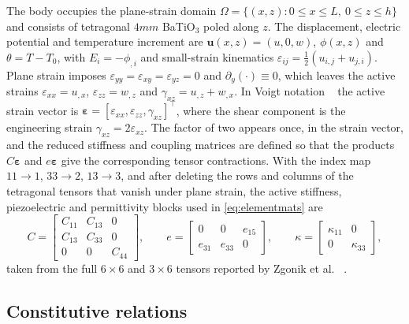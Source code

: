 \documentclass[a4paper,12pt]{elsarticle}
\begin{document}
The body occupies the plane-strain domain $\Omega=\{(x,z):0\le x\le L,\ 0\le z\le h\}$
and consists of tetragonal $4mm$ BaTiO$_3$ poled along $z$. The displacement, electric
potential and temperature increment are $\bm u(x,z)=(u,0,w)$, $\phi(x,z)$ and
$\theta=T-T_0$, with $E_i=-\phi_{,i}$ and small-strain kinematics
$\varepsilon_{ij}=\tfrac12(u_{i,j}+u_{j,i})$. Plane strain imposes
$\varepsilon_{yy}=\varepsilon_{xy}=\varepsilon_{yz}=0$ and $\partial_y(\cdot)\equiv0$,
which leaves the active strains $\varepsilon_{xx}=u_{,x}$, $\varepsilon_{zz}=w_{,z}$
and $\gamma_{xz}=u_{,z}+w_{,x}$. In Voigt notation ~\cite{Nye1985,IEEE176} the active
strain vector is $\bm\varepsilon=[\varepsilon_{xx},\varepsilon_{zz},\gamma_{xz}]^\top$,
where the shear component is the engineering strain $\gamma_{xz}=2\varepsilon_{xz}$.
The factor of two appears once, in the strain vector, and the reduced stiffness and
coupling matrices are defined so that the products $C\bm\varepsilon$ and
$e\bm\varepsilon$ give the corresponding tensor contractions. With the index map
$11\to1$, $33\to2$, $13\to3$, and after deleting the rows and columns of the tetragonal
tensors that vanish under plane strain, the active stiffness, piezoelectric and
permittivity blocks used in \eqref{eq:elementmats} are
\begin{equation}
C=\begin{bmatrix}C_{11}&C_{13}&0\\C_{13}&C_{33}&0\\0&0&C_{44}\end{bmatrix},
\qquad
e=\begin{bmatrix}0&0&e_{15}\\e_{31}&e_{33}&0\end{bmatrix},
\qquad
\kappa=\begin{bmatrix}\kappa_{11}&0\\0&\kappa_{33}\end{bmatrix},
\label{eq:voigtblocks}
\end{equation}
taken from the full $6\times6$ and $3\times6$ tensors reported by Zgonik et al.
~\cite{Zgonik1994}.

\subsection{Constitutive relations}
\end{document}
